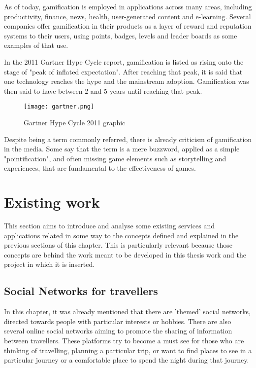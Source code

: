 As of today, gamification is employed in applications across many areas, including productivity, finance, news, health, user-generated content and e-learning. Several companies offer gamification in their products as a layer of reward and reputation systems to their users, using points, badges, levels and leader boards as some examples of that use. 

In the 2011 Gartner Hype Cycle report, gamification is listed as rising onto the stage of "peak of inflated expectation". After reaching that peak, it is said that one technology reaches the hype and the mainstream adoption. Gamification was then said to have between 2 and 5 years until reaching that peak.

\begin{figure}[h!]
  \begin{center}
    \leavevmode
    \texttt{[image: gartner.png]}
    \caption{Gartner Hype Cycle 2011 graphic}
    \label{fig:gart}
  \end{center}
\end{figure}

Despite being a term commonly referred, there is already criticism of gamification in the media. Some say that the term is a mere buzzword, applied as a simple "pointification", and often missing game elements such as storytelling and experiences, that are fundamental to the effectiveness of games.


\section{Existing work}

This section aims to introduce and analyse some existing services and applications related in some way to the concepts defined and explained in the previous sections of this chapter. This is particularly relevant because those concepts are behind the work meant to be developed in this thesis work and the project in which it is inserted.

\subsection{Social Networks for travellers}

In this chapter, it was already mentioned that there are 'themed' social networks, directed towards
people with particular interests or hobbies. 
There are also several online social networks aiming to promote the sharing of information between travellers. These platforms try to become a must see for those who are thinking of travelling, planning a particular trip, or want to find places to see in a particular journey or a comfortable place to spend the night during that journey.

